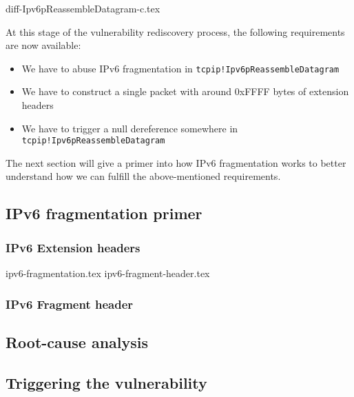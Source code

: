 \documentclass{report}
\begin{document}
{diff-Ipv6pReassembleDatagram-c.tex}

At this stage of the vulnerability rediscovery process, the following requirements are now available:
\begin{itemize}
    \item We have to abuse IPv6 fragmentation in \texttt{tcpip!Ipv6pReassembleDatagram}
    \item We have to construct a single packet with around 0xFFFF bytes of extension headers
    \item We have to trigger a null dereference somewhere in \texttt{tcpip!Ipv6pReassembleDatagram}
\end{itemize}

The next section will give a primer into how IPv6 fragmentation works to better understand how we can fulfill the above-mentioned requirements.

\subsection{IPv6 fragmentation primer}
\subsubsection{IPv6 Extension headers}
\cite[sec. 4.5]{url:rfc:ipv6}
{ipv6-fragmentation.tex}
{ipv6-fragment-header.tex}

\subsubsection{IPv6 Fragment header}



\subsection{Root-cause analysis}

\subsection{Triggering the vulnerability}

\end{document}
